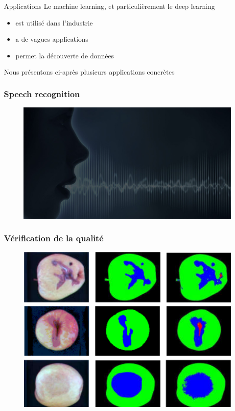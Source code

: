 \documentclass[compress]{beamer}
\begin{document}
\begin{frame}{Applications}
	Le machine learning, et particulièrement le deep learning 
	\begin{itemize}
		\item est utilisé dans l'industrie
		\item a de vagues applications
		\item permet la découverte de données
	\end{itemize}
	
	Nous présentons ci-après plusieurs applications concrètes
\end{frame}

\begin{frame}
	\frametitle{Speech recognition}
	
	\begin{figure}
		\centering
		\includegraphics[width=1\linewidth]{resources/speech}
	\end{figure}
	
\end{frame}

\begin{frame}
	\frametitle{Vérification de la qualité}
	
	\begin{figure}
		\centering
		\includegraphics[width=0.8\linewidth]{resources/quality}
	\end{figure}
	
\end{frame}
\end{document}
